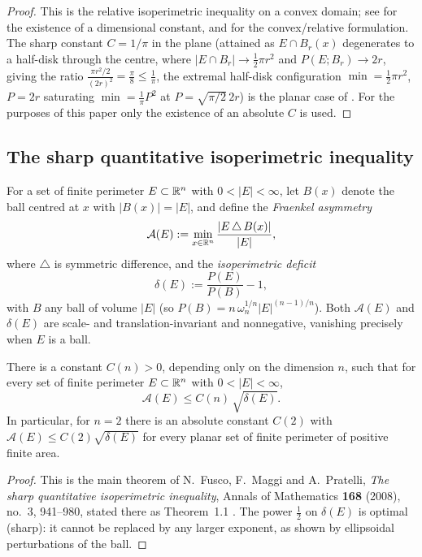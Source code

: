 \begin{proof}
This is the relative isoperimetric inequality on a convex domain; see
\cite[Theorem~2, Section~5.6.2]{EvansGariepy2015} for the existence of a
dimensional constant, and \cite[Section~12.5 and Theorem~14.4]{Maggi2012} for
the convex/relative formulation. The sharp constant $C=1/\pi$ in the plane
(attained as $E\cap B_r(x)$ degenerates to a half-disk through the centre,
where $|E\cap B_r|\to\frac12\pi r^2$ and $P(E;B_r)\to 2r$, giving the ratio
$\frac{\pi r^2/2}{(2r)^2}=\frac{\pi}{8}\le\frac1\pi$, the extremal half-disk
configuration $\min=\frac12\pi r^2$, $P=2r$ saturating $\min=\frac1\pi P^2$ at
$P=\sqrt{\pi/2}\,2r$) is the planar case of
\cite[Theorem~14.4]{Maggi2012}. For the purposes of this paper only the
existence of an absolute $C$ is used.
\end{proof}

\subsection{The sharp quantitative isoperimetric inequality}
\label{ss:fmp}

For a set of finite perimeter $E\subset\mathbb{R}^n$ with $0<|E|<\infty$, let $B(x)$
denote the ball centred at $x$ with $|B(x)|=|E|$, and define the
\emph{Fraenkel asymmetry}
\[
  \mathcal A(E):=\min_{x\in\mathbb{R}^n}\frac{|E\,\triangle\,B(x)|}{|E|},
\]
where $\triangle$ is symmetric difference, and the \emph{isoperimetric
deficit}
\[
  \delta(E):=\frac{P(E)}{P(B)}-1,
\]
with $B$ any ball of volume $|E|$ (so $P(B)=n\,\omega_n^{1/n}|E|^{(n-1)/n}$).
Both $\mathcal A(E)$ and $\delta(E)$ are scale- and translation-invariant and
nonnegative, vanishing precisely when $E$ is a ball.

\begin{theorem}\label{thm:fmp}
There is a constant $C(n)>0$, depending only on the dimension $n$, such that
for every set of finite perimeter $E\subset\mathbb{R}^n$ with $0<|E|<\infty$,
\[
  \mathcal A(E)\le C(n)\,\sqrt{\delta(E)} .
\]
In particular, for $n=2$ there is an absolute constant $C(2)$ with
$\mathcal A(E)\le C(2)\sqrt{\delta(E)}$ for every planar set of finite
perimeter of positive finite area.
\end{theorem}

\begin{proof}
This is the main theorem of N.~Fusco, F.~Maggi and A.~Pratelli,
\emph{The sharp quantitative isoperimetric inequality}, Annals of Mathematics
\textbf{168} (2008), no.~3, 941--980, stated there as Theorem~1.1
\cite{FMP2008}. The power $\tfrac12$ on $\delta(E)$ is optimal (sharp): it
cannot be replaced by any larger exponent, as shown by ellipsoidal
perturbations of the ball.
\end{proof}

